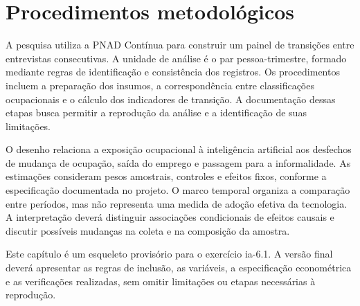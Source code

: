 \section{Procedimentos metodológicos}
\label{sec:metodologia}

A pesquisa utiliza a PNAD Contínua para construir um painel de transições entre entrevistas consecutivas. A unidade de análise é o par pessoa-trimestre, formado mediante regras de identificação e consistência dos registros. Os procedimentos incluem a preparação dos insumos, a correspondência entre classificações ocupacionais e o cálculo dos indicadores de transição. A documentação dessas etapas busca permitir a reprodução da análise e a identificação de suas limitações.

O desenho relaciona a exposição ocupacional à inteligência artificial aos desfechos de mudança de ocupação, saída do emprego e passagem para a informalidade. As estimações consideram pesos amostrais, controles e efeitos fixos, conforme a especificação documentada no projeto. O marco temporal organiza a comparação entre períodos, mas não representa uma medida de adoção efetiva da tecnologia. A interpretação deverá distinguir associações condicionais de efeitos causais e discutir possíveis mudanças na coleta e na composição da amostra.

Este capítulo é um esqueleto provisório para o exercício ia-6.1. A versão final deverá apresentar as regras de inclusão, as variáveis, a especificação econométrica e as verificações realizadas, sem omitir limitações ou etapas necessárias à reprodução.
